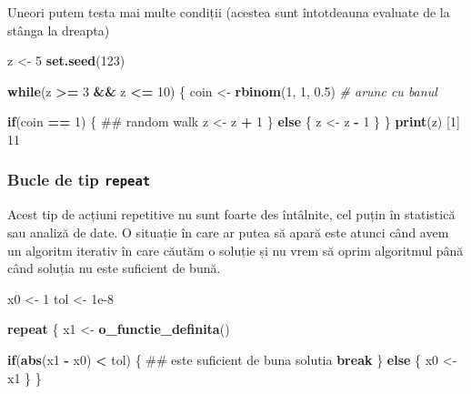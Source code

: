 \documentclass[]{article}
\newenvironment{Shaded}{\begin{snugshade}}{\end{snugshade}}
\newcommand{\KeywordTok}[1]{\textcolor[rgb]{0.13,0.29,0.53}{\textbf{#1}}}
\newcommand{\DecValTok}[1]{\textcolor[rgb]{0.00,0.00,0.81}{#1}}
\newcommand{\FloatTok}[1]{\textcolor[rgb]{0.00,0.00,0.81}{#1}}
\newcommand{\StringTok}[1]{\textcolor[rgb]{0.31,0.60,0.02}{#1}}
\newcommand{\CommentTok}[1]{\textcolor[rgb]{0.56,0.35,0.01}{\textit{#1}}}
\newcommand{\ControlFlowTok}[1]{\textcolor[rgb]{0.13,0.29,0.53}{\textbf{#1}}}
\newcommand{\OperatorTok}[1]{\textcolor[rgb]{0.81,0.36,0.00}{\textbf{#1}}}
\newcommand{\NormalTok}[1]{#1}
\begin{document}
Uneori putem testa mai multe condiții (acestea sunt întotdeauna evaluate
de la stânga la dreapta)

\begin{Shaded}
\begin{Highlighting}[]
\NormalTok{z <-}\StringTok{ }\DecValTok{5}
\KeywordTok{set.seed}\NormalTok{(}\DecValTok{123}\NormalTok{)}

\ControlFlowTok{while}\NormalTok{(z }\OperatorTok{>=}\StringTok{ }\DecValTok{3} \OperatorTok{&&}\StringTok{ }\NormalTok{z }\OperatorTok{<=}\StringTok{ }\DecValTok{10}\NormalTok{) \{}
\NormalTok{        coin <-}\StringTok{ }\KeywordTok{rbinom}\NormalTok{(}\DecValTok{1}\NormalTok{, }\DecValTok{1}\NormalTok{, }\FloatTok{0.5}\NormalTok{) }\CommentTok{# arunc cu banul}
        
        \ControlFlowTok{if}\NormalTok{(coin }\OperatorTok{==}\StringTok{ }\DecValTok{1}\NormalTok{) \{  ## random walk}
\NormalTok{                z <-}\StringTok{ }\NormalTok{z }\OperatorTok{+}\StringTok{ }\DecValTok{1}
\NormalTok{        \} }\ControlFlowTok{else}\NormalTok{ \{}
\NormalTok{                z <-}\StringTok{ }\NormalTok{z }\OperatorTok{-}\StringTok{ }\DecValTok{1}
\NormalTok{        \} }
\NormalTok{\}}
\KeywordTok{print}\NormalTok{(z)}
\NormalTok{[}\DecValTok{1}\NormalTok{] }\DecValTok{11}
\end{Highlighting}
\end{Shaded}

\subsubsection{\texorpdfstring{Bucle de tip
\texttt{repeat}}{Bucle de tip repeat}}\label{bucle-de-tip-repeat}

Acest tip de acțiuni repetitive nu sunt foarte des întâlnite, cel puțin
în statistică sau analiză de date. O situație în care ar putea să apară
este atunci când avem un algoritm iterativ în care căutăm o soluție și
nu vrem să oprim algoritmul până când soluția nu este suficient de bună.

\begin{Shaded}
\begin{Highlighting}[]
\NormalTok{x0 <-}\StringTok{ }\DecValTok{1}
\NormalTok{tol <-}\StringTok{ }\FloatTok{1e-8}

\ControlFlowTok{repeat}\NormalTok{ \{}
\NormalTok{        x1 <-}\StringTok{ }\KeywordTok{o_functie_definita}\NormalTok{()}
        
        \ControlFlowTok{if}\NormalTok{(}\KeywordTok{abs}\NormalTok{(x1 }\OperatorTok{-}\StringTok{ }\NormalTok{x0) }\OperatorTok{<}\StringTok{ }\NormalTok{tol) \{  ## este suficient de buna solutia }
                \ControlFlowTok{break}
\NormalTok{        \} }\ControlFlowTok{else}\NormalTok{ \{}
\NormalTok{                x0 <-}\StringTok{ }\NormalTok{x1}
\NormalTok{        \} }
\NormalTok{\}}
\end{Highlighting}
\end{Shaded}
\end{document}

